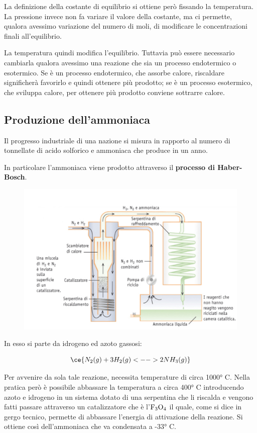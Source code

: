 \vspace{0.2cm}\normalsize La definizione della costante di equilibrio si ottiene però fissando la temperatura. La pressione invece non fa variare il valore della costante, ma ci permette, qualora avessimo variazione del numero di moli, di modificare le concentrazioni finali all'equilibrio.

La temperatura quindi modifica l'equilibrio. Tuttavia può essere necessario cambiarla qualora avessimo una reazione che sia un processo endotermico o esotermico. Se è un processo endotermico, che assorbe calore, riscaldare significherà favorirlo e quindi ottenere più prodotto; se è un processo esotermico, che sviluppa calore, per ottenere più prodotto conviene sottrarre calore.
\subsection{Produzione dell'ammoniaca}
Il progresso industriale di una nazione si misura in rapporto al numero di tonnellate di acido solforico e ammoniaca che produce in un anno.

In particolare l'ammoniaca viene prodotto attraverso il \textbf{processo di Haber-Bosch}.

\vspace{-0.4cm}\begin{figure}[htp]
    \centering
    \includegraphics[width=14cm]{immagini/produzione_ammoniaca.png}
\end{figure}

In esso si parte da idrogeno ed azoto gassosi:

$$\ce{N_2(g) + 3H_2(g) <--> 2NH_3(g)}$$

Per avvenire da sola tale reazione, necessita temperature di circa 1000° C. Nella pratica però è possibile abbassare la temperatura a circa 400° C introducendo azoto e idrogeno in un sistema dotato di una serpentina che li riscalda e vengono fatti passare attraverso un catalizzatore che è l'$\rm F_3O_4$ il quale, come si dice in gergo tecnico, permette di abbassare l'energia di attivazione della reazione. Si ottiene così dell'ammoniaca che va condensata a -33° C.

